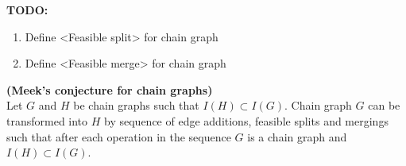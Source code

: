 %
%
%



\textbf{TODO:}
\begin{enumerate}
	\item Define <Feasible split> for chain graph
	\item Define <Feasible merge> for chain graph
\end{enumerate}

\begin{thm} \textbf{(Meek's conjecture for chain graphs)} \\
	Let $G$ and $H$ be chain graphs such that $I(H) \subset I(G)$. 
	Chain graph $G$ can be transformed into $H$ by sequence of edge additions, feasible splits and mergings such that
	after each operation in the sequence $G$ is a chain graph and $I(H) \subset I(G)$.
\end{thm}
